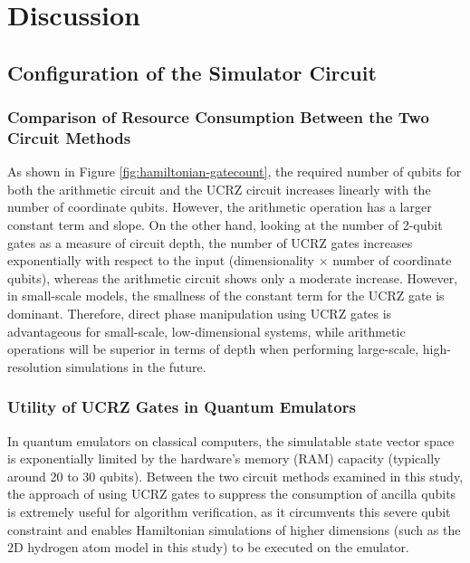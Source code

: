 \documentclass[jctc-draft.tex]{subfiles}
\begin{document}
\section{Discussion}
\label{sec:analysis}
\subsection{Configuration of the Simulator Circuit}
\label{sec:circuit-structure-analysis}
\subsubsection{Comparison of Resource Consumption Between the Two Circuit Methods}
As shown in Figure \ref{fig:hamiltonian-gatecount}, the required number of
qubits for both the arithmetic circuit and the UCRZ circuit increases linearly
with the number of coordinate qubits. However, the arithmetic operation has a
larger constant term and slope. On the other hand, looking at the number of
2-qubit gates as a measure of circuit depth, the number of UCRZ gates increases
exponentially with respect to the input (dimensionality $\times$ number of
coordinate qubits), whereas the arithmetic circuit shows only a moderate
increase. However, in small-scale models, the smallness of the constant term for
the UCRZ gate is dominant. Therefore, direct phase manipulation using UCRZ gates
is advantageous for small-scale, low-dimensional systems, while arithmetic
operations will be superior in terms of depth when performing large-scale,
high-resolution simulations in the future.

\subsubsection{Utility of UCRZ Gates in Quantum Emulators}
In quantum emulators on classical computers, the simulatable state vector space
is exponentially limited by the hardware's memory (RAM) capacity (typically
around 20 to 30 qubits). Between the two circuit methods examined in this study,
the approach of using UCRZ gates to suppress the consumption of ancilla qubits
is extremely useful for algorithm verification, as it circumvents this severe
qubit constraint and enables Hamiltonian simulations of higher dimensions (such
as the 2D hydrogen atom model in this study) to be executed on the emulator.
\end{document}

